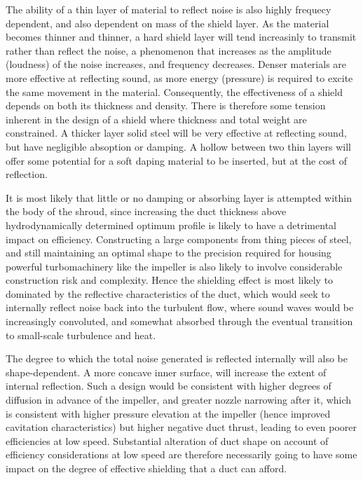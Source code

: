 \documentclass{article}\usepackage[]{graphicx}\usepackage[]{color}
\begin{document}
The ability of a thin layer of material to reflect noise is also highly frequecy dependent, and also dependent on mass of the shield layer.  As the material becomes thinner and thinner, a hard shield layer will tend increasinly to transmit rather than reflect the noise, a phenomenon that increases as the amplitude (loudness) of the noise increases, and frequency decreases.  Denser materials are more effective at reflecting sound, as more energy (pressure) is required to excite the same movement in the material.  Consequently, the effectiveness of a shield depends on both its thickness and density.  There is therefore some tension inherent in the design of a shield where thickness and total weight are constrained.  A thicker layer solid steel will be very effective at reflecting sound, but have negligible absoption or damping.  A hollow between two thin layers will offer some potential for a soft daping material to be inserted, but at the cost of reflection.

It is most likely that little or no damping or absorbing layer is attempted within the body of the shroud, since increasing the duct thickness above hydrodynamically determined optimum profile is likely to have a detrimental impact on efficiency.  Constructing a large components from thing pieces of steel, and still maintaining an optimal shape to the precision required for housing powerful turbomachinery like the impeller is also likely to involve considerable construction risk and complexity.  Hence the shielding effect is most likely to dominated by the reflective characteristics of the duct, which would seek to internally reflect noise back into the turbulent flow, where sound waves would be increasingly convoluted, and somewhat absorbed through the eventual transition to small-scale turbulence and heat.

The degree to which the total noise generated is reflected internally will also be shape-dependent.  A more concave inner surface, will increase the extent of internal reflection.  Such a design would be consistent with higher degrees of diffusion in advance of the impeller, and greater nozzle narrowing after it, which is consistent with higher pressure elevation at the impeller (hence improved cavitation characteristics) but higher negative duct thrust, leading to even poorer efficiencies at low speed.  Substantial alteration of duct shape on account of efficiency considerations at low speed are therefore necessarily going to have some impact on the degree of effective shielding that a duct can afford.
\end{document}
